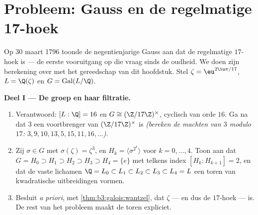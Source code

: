 \section{Probleem: Gauss en de regelmatige 17-hoek}

\begin{problem}\label{pb:b3:galois:1}
Op 30 maart 1796 toonde de negentienjarige Gauss aan dat de
regelmatige $17$-hoek  is --- de eerste vooruitgang
op die vraag sinds de oudheid. We doen zijn berekening over met
het gereedschap van dit hoofdstuk. Stel $\zeta =
\eu^{2\iu\pi/17}$, $L = \Q(\zeta)$ en $G =
\operatorname{Gal}(L/\Q)$.

\medskip
\noindent\textbf{Deel I --- De groep en haar filtratie.}
\begin{enumerate}
  \item Verantwoord: $[L:\Q] = 16$ en $G \cong (\Z/17\Z)^\times$,
        cyclisch van orde $16$. Ga na dat $3$ een voortbrenger van
        $(\Z/17\Z)^\times$ is \emph{(bereken de machten van $3$
        modulo $17$: $3, 9, 10, 13, 5, 15, 11, 16, \dots$)}.
  \item Zij $\sigma \in G$ met $\sigma(\zeta) = \zeta^3$, en $H_k
        = \langle \sigma^{2^k}\rangle$ voor $k = 0, \dots, 4$.
        Toon aan dat $G = H_0 \supset H_1 \supset H_2 \supset H_3
        \supset H_4 = \{e\}$ met telkens index $[H_k : H_{k+1}] =
        2$, en dat de vaste lichamen $\Q = L_0 \subset L_1 \subset
        L_2 \subset L_3 \subset L_4 = L$ een toren van
        kwadratische uitbreidingen vormen.
  \item Besluit \emph{a priori}, met
        \cref{thm:b3:galois:wantzel}, dat $\zeta$ --- en dus de
        $17$-hoek ---  is. De rest van het probleem
        maakt de toren expliciet.
\end{enumerate}


\end{problem}
